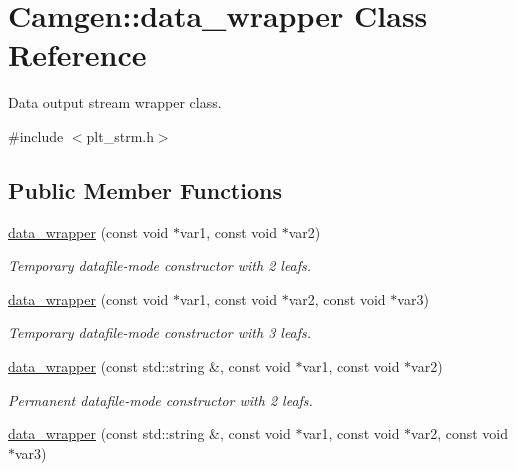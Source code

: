 \hypertarget{a00116}{}\section{Camgen\+:\+:data\+\_\+wrapper Class Reference}
\label{a00116}


Data output stream wrapper class.  




{\ttfamily \#include $<$plt\+\_\+strm.\+h$>$}

\subsection*{Public Member Functions}
\begin{DoxyCompactItemize}
\item 
\hypertarget{a00116_a6cd8e44f93a3b9bd5d26f92fa41e60e0}{}\hyperlink{a00116_a6cd8e44f93a3b9bd5d26f92fa41e60e0}{data\+\_\+wrapper} (const void $\ast$var1, const void $\ast$var2)\label{a00116_a6cd8e44f93a3b9bd5d26f92fa41e60e0}

\begin{DoxyCompactList}\small\item\em Temporary datafile-\/mode constructor with 2 leafs. \end{DoxyCompactList}\item 
\hypertarget{a00116_ab7febefd6f251fdcbb279389f7dab4c0}{}\hyperlink{a00116_ab7febefd6f251fdcbb279389f7dab4c0}{data\+\_\+wrapper} (const void $\ast$var1, const void $\ast$var2, const void $\ast$var3)\label{a00116_ab7febefd6f251fdcbb279389f7dab4c0}

\begin{DoxyCompactList}\small\item\em Temporary datafile-\/mode constructor with 3 leafs. \end{DoxyCompactList}\item 
\hypertarget{a00116_a79ef419d020f7baf11dafb83ffe6d837}{}\hyperlink{a00116_a79ef419d020f7baf11dafb83ffe6d837}{data\+\_\+wrapper} (const std\+::string \&, const void $\ast$var1, const void $\ast$var2)\label{a00116_a79ef419d020f7baf11dafb83ffe6d837}

\begin{DoxyCompactList}\small\item\em Permanent datafile-\/mode constructor with 2 leafs. \end{DoxyCompactList}\item 
\hypertarget{a00116_ac7ffb36f13890d5771591a1b50c17cfd}{}\hyperlink{a00116_ac7ffb36f13890d5771591a1b50c17cfd}{data\+\_\+wrapper} (const std\+::string \&, const void $\ast$var1, const void $\ast$var2, const void $\ast$var3)\label{a00116_ac7ffb36f13890d5771591a1b50c17cfd}


\end{DoxyCompactItemize}
